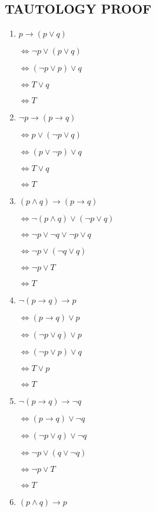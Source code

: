 \documentclass{../../cls/sig-alternate-05-2015}
\begin{document}
\subsection{TAUTOLOGY PROOF}
\begin{enumerate}
\item $p\rightarrow (p\vee q )$

$\Leftrightarrow \neg p \vee (p \vee q)$

$\Leftrightarrow (\neg p \vee p) \vee q$

$\Leftrightarrow T \vee q$ 

$\Leftrightarrow T$
\item     $\neg p \rightarrow (p\rightarrow q)$

$\Leftrightarrow p \vee (\neg p\vee q)$

$\Leftrightarrow (p \vee \neg p) \vee q$

$\Leftrightarrow T \vee q$
    
$\Leftrightarrow T$
\item $(p\wedge q)\rightarrow (p\rightarrow q)$

$\Leftrightarrow \neg (p\wedge q)\vee (\neg p\vee q)$

$\Leftrightarrow \neg p\vee \neg q\vee \neg p\vee q$

$\Leftrightarrow \neg p\vee (\neg q \vee q)$

$\Leftrightarrow \neg p\vee T$

$\Leftrightarrow  T$
\item $\neg (p\rightarrow q)\rightarrow p$

$\Leftrightarrow  (p\rightarrow q)\vee p$

$\Leftrightarrow  (\neg p\vee q)\vee p$

$\Leftrightarrow  (\neg p\vee p)\vee q$

$\Leftrightarrow  T\vee p$

$\Leftrightarrow  T$
\item $\neg (p \rightarrow q) \rightarrow \neg q$

$\Leftrightarrow  (p \rightarrow q) \vee \neg q$

$\Leftrightarrow  (\neg p \vee q) \vee \neg q$

$\Leftrightarrow  \neg p \vee (q \vee \neg q)$

$\Leftrightarrow  \neg p \vee T$

$\Leftrightarrow   T$
    
\item $(p\wedge q)\rightarrow p$


\end{enumerate}
\end{document}
